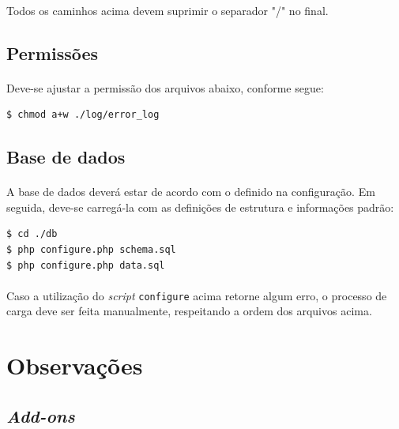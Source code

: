 \documentclass[a4paper,12pt]{article}
\begin{document}
\paragraph{}
Todos os caminhos acima devem suprimir o separador "/" no final.

\subsection{Permissões}

\paragraph{}
Deve-se ajustar a permissão dos arquivos abaixo, conforme segue:

\begin{verbatim}
$ chmod a+w ./log/error_log
\end{verbatim}

\subsection{Base de dados}

\paragraph{}
A base de dados deverá estar de acordo com o definido na configuração. Em seguida, deve-se carregá-la com as definições de estrutura e informações padrão:

\begin{verbatim}
$ cd ./db
$ php configure.php schema.sql
$ php configure.php data.sql
\end{verbatim}

\paragraph{}
Caso a utilização do \emph{script} \texttt{configure} acima retorne algum erro, o processo de carga deve ser feita manualmente, respeitando a ordem dos arquivos acima.


\appendix

\section{Observações}

\subsection{\emph{Add-ons}}
\end{document}

